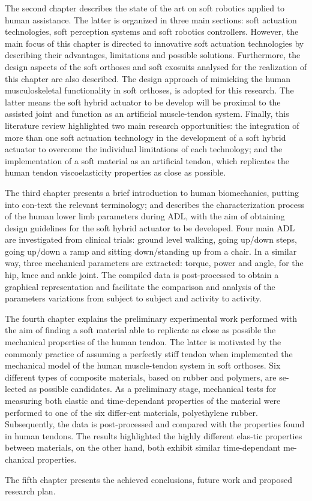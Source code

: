 The second chapter describes the state of the art on soft robotics applied to human assistance. The latter is organized in three main sections: soft actuation technologies, soft perception systems and soft robotics controllers. However, the main focus of this chapter is directed to innovative soft actuation technologies by describing their advantages, limitations and possible solutions. Furthermore, the design aspects of the soft orthoses and soft exosuits analysed for the realization of this chapter are also described. The design approach of mimicking the human musculoskeletal functionality in soft orthoses, is adopted for this research. The latter means the soft hybrid actuator to be develop will be proximal to the assisted joint and function as an artificial muscle-tendon system. Finally, this literature review highlighted two main research opportunities: the integration of more than one soft actuation technology in the development of a soft hybrid actuator to overcome the individual limitations of each technology; and the implementation of a soft material as an artificial tendon, which replicates the human tendon viscoelasticity properties as close as possible.

The third chapter presents a brief introduction to human biomechanics, putting into con-text the relevant terminology; and describes the characterization process of the human lower limb parameters during ADL, with the aim of obtaining design guidelines for the soft hybrid actuator to be developed. Four main ADL are investigated from clinical trials: ground level walking, going up/down steps, going up/down a ramp and sitting down/standing up from a chair. In a similar way, three mechanical parameters are extracted: torque, power and angle, for the hip, knee and ankle joint. The compiled data is post-processed to obtain a graphical representation and facilitate the comparison and analysis of the parameters variations from subject to subject and activity to activity.

The fourth chapter explains the preliminary experimental work performed with the aim of finding a soft material able to replicate as close as possible the mechanical properties of the human tendon. The latter is motivated by the commonly practice of assuming a perfectly stiff tendon when implemented the mechanical model of the human muscle-tendon system in soft orthoses. Six different types of composite materials, based on rubber and polymers, are se-lected as possible candidates. As a preliminary stage, mechanical tests for measuring both elastic and time-dependant properties of the material were performed to one of the six differ-ent materials, polyethylene rubber. Subsequently, the data is post-processed and compared with the properties found in human tendons. The results highlighted the highly different elas-tic properties between materials, on the other hand, both exhibit similar time-dependant me-chanical properties.

The fifth chapter presents the achieved conclusions, future work and proposed research plan.
